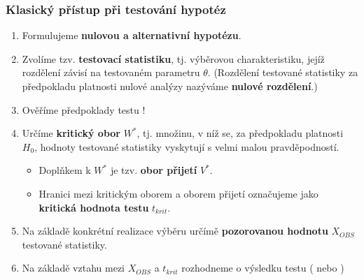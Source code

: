 \subsubsection{Klasický přístup při testování hypotéz}
\begin{enumerate}
	\item Formulujeme \textbf{nulovou a alternativní hypotézu}.
	\item Zvolíme tzv. \textbf{testovací statistiku}, tj. výběrovou charakteristiku, jejíž rozdělení závisí na testovaném parametru $\theta$. (Rozdělení testované statistiky za předpokladu platnosti nulové analýzy nazýváme \textbf{nulové rozdělení}.)
	\item Ověříme předpoklady testu ! %
	\item Určíme \textbf{kritický obor} $W^*$, tj. množinu, v níž se, za předpokladu platnosti $H_0$, hodnoty testované statistiky vyskytují s velmi malou pravděpodností.
	\begin{itemize}
		\item Doplňkem k $W^*$ je tzv. \textbf{obor přijetí} $V^*$.
		\item Hranici mezi kritickým oborem a oborem přijetí označujeme jako \textbf{kritická hodnota testu} $t_{krit}$.
	\end{itemize}
	\item Na základě konkrétní realizace výběru určímě \textbf{pozorovanou hodnotu} $X_{OBS}$ testované statistiky. 
	\item Na základě vztahu mezi $X_{OBS}$ a $t_{krit}$ rozhodneme o výsledku testu ( nebo )
\end{enumerate}
